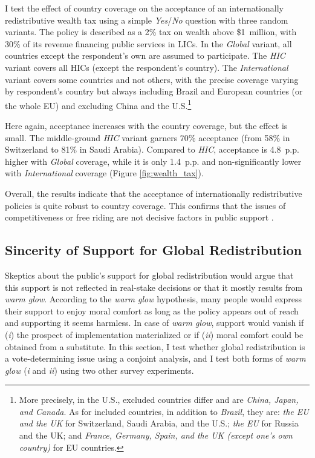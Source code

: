 \documentclass[12pt,english]{article}
\begin{document}
\begin{bibunit}
I test the effect of country coverage on the acceptance of an internationally redistributive wealth tax using a simple \textit{Yes}/\textit{No} question with three random variants. The policy is described as a 2\% tax on wealth above \$1~million, with 30\% of its revenue financing public services in LICs. In the \textit{Global} variant, all countries except the respondent's own are assumed to participate. The \textit{HIC} variant covers all HICs (except the respondent's country). The \textit{International} variant covers some countries and not others, with the precise coverage varying by respondent's country but always including Brazil and European countries (or the whole EU) and excluding China and the U.S.\footnote{More precisely, in the U.S., excluded countries differ and are \textit{China, Japan, and Canada}. As for included countries, in addition to \textit{Brazil}, they are: \textit{the EU and the UK} for Switzerland, Saudi Arabia, and the U.S.; \textit{the EU} for Russia and the UK; and \textit{France, Germany, Spain, and the UK (except one's own country)} for EU countries.}

Here again, acceptance increases with the country coverage, but the effect is small. The middle-ground \textit{HIC} variant garners 70\% acceptance (from 58\% in Switzerland to 81\% in Saudi Arabia). Compared to \textit{HIC}, acceptance is 4.8~p.p. higher with \textit{Global} coverage, while it is only 1.4~p.p. and non-significantly lower with \textit{International} coverage (Figure \ref{fig:wealth_tax}). 


Overall, the results indicate that the acceptance of internationally redistributive policies is quite robust to country coverage. This confirms that the issues of competitiveness or free riding are not decisive factors in public support \citep{aklin_prisoners_2020}. 

\subsection{Sincerity of Support for Global Redistribution\label{sec:sincerity}}

Skeptics about the public's support for global redistribution would argue that this support is not reflected in real-stake decisions or that it mostly results from \textit{warm glow}. According to the \textit{warm glow} hypothesis, many people would express their support to enjoy moral comfort as long as the policy appears out of reach and supporting it seems harmless. In case of \textit{warm glow}, support would vanish if (\textit{i}) the prospect of implementation materialized or if (\textit{ii}) moral comfort could be obtained from a substitute. In this section, I test whether global redistribution is a vote-determining issue using a conjoint analysis, and I test both forms of \textit{warm glow} (\textit{i} and \textit{ii}) using two other survey experiments.


\end{bibunit}
\end{document}
